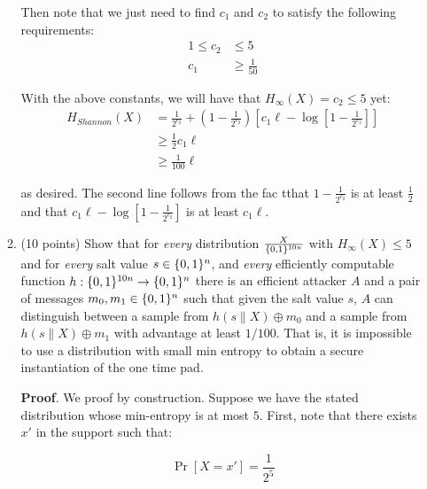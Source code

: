 \documentclass{article}
\begin{document}
\begin{enumerate}[,start=4]
\begin{enumerate}[,label=\alph*.]
Then note that we just need to find $c_1$ and $c_2$ to satisfy the following requirements:%
\noindent\noindent\[%
\begin{aligned}
1 \leq c_2 &\leq 5 \\
c_1 &\geq \frac{1}{50}
\end{aligned}
\]%

With the above constants, we will have that $H_{\infty}(X) = c_2 \leq 5$ yet:%
\noindent\noindent\[%
\begin{aligned}
H_{Shannon}(X) &= \frac{1}{2^{c_2}} + (1 - \frac{1}{2^{c_2}})[c_1 \ell - \log [1 - \frac{1}{2^{c_2}}]] \\
&\geq \frac{1}{2}c_1 \ell \\
&\geq \frac{1}{100}\ell
\end{aligned}
\]%

as desired. The second line follows from the fac tthat $1- \frac{1}{2^{c_2}}$ is at least 
$\frac{1}{2}$ and that $c_1\ell - \log[1-\frac{1}{2^{c_2}}]$ is at least $c_1\ell$.%

\item{}
(10 points) Show that for \emph{every} distribution $X \over \{0,1\}^{10n}$ with $H_{\infty}(X)\leq 5$ and for \emph{every} salt value $s\in\{0,1\}^n$, and \emph{every} efficiently computable function $h:\{0,1\}^{10n}\rightarrow\{0,1\}^n$ there is an efficient attacker $A$ and a pair of messages $m_0,m_1\in\{0,1\}^n$ such that given the salt value $s$, $A$ can distinguish between a sample from $h(s\|X)\oplus m_0$ and a sample from $h(s\|X)\oplus m_1$ with advantage at least $1/100$. That is, it is impossible to use a distribution with small min entropy to obtain a secure instantiation of the one time pad.%

\begin{mdbmarginx}{1ex}{0pt}{1ex}{0pt}%
\noindent{}\textbf{Proof}.  We proof by construction. Suppose we have the stated distribution whose min-entropy is at most
$5$. First, note that there exists $x'$ in the support such that:%
\end{mdbmarginx}%
\noindent\noindent\[%
\Pr[X = x'] = \frac{1}{2^5}
\]%


\end{enumerate}
\end{enumerate}
\end{document}
